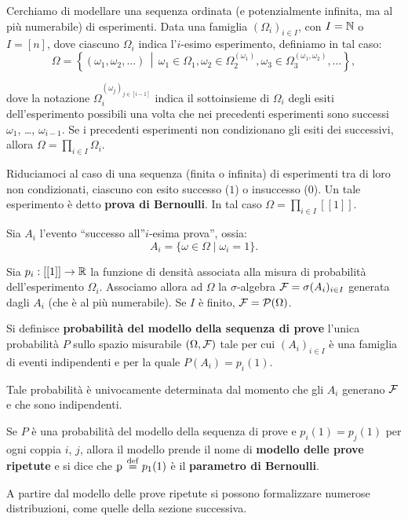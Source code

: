 \begin{multicols*}{2}
    Cerchiamo di modellare una sequenza ordinata (e potenzialmente infinita,
    ma al più numerabile)
    di esperimenti. Data una famiglia $(\Omega_i)_{i \in I}$, con $I = \mathbb{N}$ o
    $I = [n]$, dove ciascuno $\Omega_i$ indica l'$i$-esimo esperimento, definiamo
    in tal caso:
    \[ 
        \Omega = \left\{ (\omega_1, \omega_2, \ldots) \,\middle\vert\, \omega_1 \in \Omega_1, \omega_2 \in \Omega_2^{(\omega_1)}, \omega_3 \in \Omega_3^{(\omega_1, \omega_2)}, \ldots\right\},
    \]

    dove la notazione $\Omega_i^{(\omega_j)_{j \in [i-1]}}$ indica il sottoinsieme
    di $\Omega_i$ degli esiti dell'esperimento possibili una volta che nei precedenti
    esperimenti sono successi $\omega_1$, \ldots, $\omega_{i-1}$. Se i precedenti
    esperimenti non condizionano gli esiti dei successivi, allora
    $\Omega = \prod_{i \in I} \Omega_i$. \medskip


    Riduciamoci al caso di una sequenza (finita o infinita) di esperimenti tra di
    loro non condizionati, ciascuno
    con esito successo ($1$) o insuccesso ($0$). Un tale esperimento è
    detto \textbf{prova di Bernoulli}. In tal caso $\Omega = \prod_{i \in I} [[1]]$. \medskip
    
    
    Sia $A_i$ l'evento ``successo all''$i$-esima prova'', ossia:
    \[
        A_i = \{ \omega \in \Omega \mid \omega_i = 1 \}.
    \]

    Sia $p_i : [[1]] \to \mathbb{R}$ la funzione di densità associata alla misura
    di probabilità dell'esperimento $\Omega_i$. Associamo allora ad $\Omega$ la $\sigma$-algebra $\mathcal{F} = \sigma(A_i)_{i \in I}$ generata
    dagli $A_i$ (che è al più numerabile). Se $I$ è finito, $\mathcal{F} = \mathcal{P}(\Omega)$.

    \begin{definition}
        Si definisce \textbf{probabilità del modello della sequenza di prove}
        l'unica probabilità $P$ sullo spazio misurabile $(\Omega, \mathcal{F})$ tale
        per cui $(A_i)_{i \in I}$ è una famiglia di eventi indipendenti e
        per la quale $P(A_i) = p_i(1)$.
    \end{definition}

    \begin{remark}
        Tale probabilità è univocamente determinata dal momento che
        gli $A_i$ generano $\mathcal{F}$ e che sono indipendenti.
    \end{remark}

    \begin{definition}
        Se $P$ è una probabilità del modello della sequenza di prove e
        $p_i(1) = p_j(1)$ per ogni coppia $i$, $j$, allora il modello
        prende il nome di \textbf{modello delle prove ripetute} e si dice
        che $\pbern \defeq p_1(1)$ è il \textbf{parametro di Bernoulli}.
    \end{definition}

    A partire dal modello delle prove ripetute si possono formalizzare
    numerose distribuzioni, come quelle della sezione successiva.
\end{multicols*}